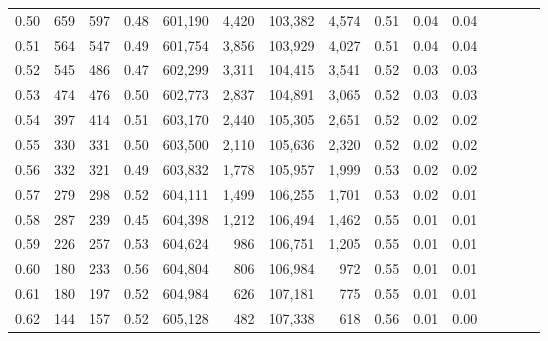 \begin{tabular}{rrrcrrrrrrrrrrr}
0.50 &     659 &    597 &                                       0.48 &  601,190 &    4,420 &  103,382 &    4,574 &  0.51 &  0.04 &                         0.04 \\
0.51 &     564 &    547 &                                       0.49 &  601,754 &    3,856 &  103,929 &    4,027 &  0.51 &  0.04 &                         0.04 \\
0.52 &     545 &    486 &                                       0.47 &  602,299 &    3,311 &  104,415 &    3,541 &  0.52 &  0.03 &                         0.03 \\
0.53 &     474 &    476 &                                       0.50 &  602,773 &    2,837 &  104,891 &    3,065 &  0.52 &  0.03 &                         0.03 \\
0.54 &     397 &    414 &                                       0.51 &  603,170 &    2,440 &  105,305 &    2,651 &  0.52 &  0.02 &                         0.02 \\
0.55 &     330 &    331 &                                       0.50 &  603,500 &    2,110 &  105,636 &    2,320 &  0.52 &  0.02 &                         0.02 \\
0.56 &     332 &    321 &                                       0.49 &  603,832 &    1,778 &  105,957 &    1,999 &  0.53 &  0.02 &                         0.02 \\
0.57 &     279 &    298 &                                       0.52 &  604,111 &    1,499 &  106,255 &    1,701 &  0.53 &  0.02 &                         0.01 \\
0.58 &     287 &    239 &                                       0.45 &  604,398 &    1,212 &  106,494 &    1,462 &  0.55 &  0.01 &                         0.01 \\
0.59 &     226 &    257 &                                       0.53 &  604,624 &      986 &  106,751 &    1,205 &  0.55 &  0.01 &                         0.01 \\
0.60 &     180 &    233 &                                       0.56 &  604,804 &      806 &  106,984 &      972 &  0.55 &  0.01 &                         0.01 \\
0.61 &     180 &    197 &                                       0.52 &  604,984 &      626 &  107,181 &      775 &  0.55 &  0.01 &                         0.01 \\
0.62 &     144 &    157 &                                       0.52 &  605,128 &      482 &  107,338 &      618 &  0.56 &  0.01 &                         0.00 \\

\end{tabular}
